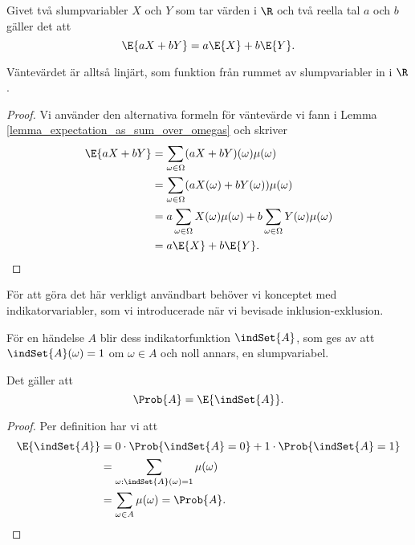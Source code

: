 \documentclass[nobib]{tufte-handout}
\begin{document}
\begin{lemma}
    Givet två slumpvariabler $X$ och $Y$ som tar värden i $\R$ och två reella tal $a$ och $b$ gäller det att
    $$\E{aX + bY} = a\E{X} + b\E{Y}.$$

    Väntevärdet är alltså linjärt, som funktion från rummet av slumpvariabler in i $\R$.

    \begin{proof}
        Vi använder den alternativa formeln för väntevärde vi fann i Lemma \ref{lemma_expectation_as_sum_over_omegas} och skriver
        \begin{align*}
            \E{aX + bY} &= \sum_{\omega \in \Omega} (aX + bY)(\omega)\mu(\omega)\\
            &= \sum_{\omega \in \Omega} (aX(\omega) + bY(\omega))\mu(\omega)\\
            &= a\sum_{\omega \in \Omega} X(\omega)\mu(\omega) + b\sum_{\omega \in \Omega} Y(\omega)\mu(\omega)\\
            &= a\E{X} + b\E{Y}.
        \end{align*}
    \end{proof}
\end{lemma}

För att göra det här verkligt användbart behöver vi konceptet med indikatorvariabler, som vi introducerade när vi bevisade inklusion-exklusion.

\begin{proposition}
    För en händelse $A$ blir dess indikatorfunktion $\indSet{A}$, som ges av att $\indSet{A}(\omega) = 1$ om $\omega \in A$ och noll annars, en slumpvariabel.

    Det gäller att
    $$\Prob{A} = \E{\indSet{A}}.$$

    \begin{proof}
        Per definition har vi att
        \begin{align*}
            \E{\indSet{A}} &= 0\cdot\Prob{\indSet{A} = 0} + 1\cdot\Prob{\indSet{A} = 1}\\
            &= \sum_{\omega: \indSet{A}(\omega) = 1} \mu(\omega)\\
            &= \sum_{\omega \in A} \mu(\omega) = \Prob{A}.
        \end{align*}
    \end{proof}
\end{proposition}
\end{document}
